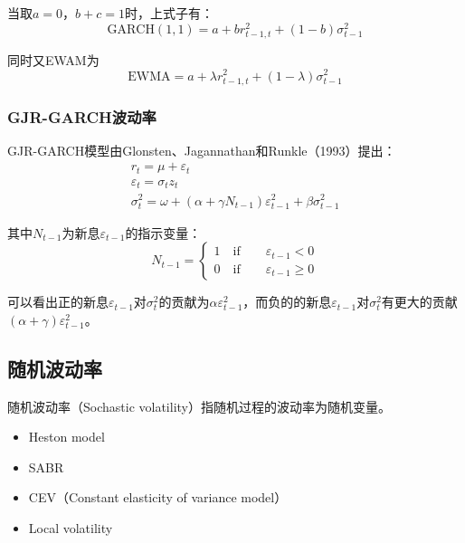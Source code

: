 \documentclass[11pt]{article}
\begin{document}
当取$a=0$，$b+c=1$时，上式子有：
\begin{equation*}
    \text{GARCH}(1,1) = a + b r^{2}_{t-1,t} + (1-b) \sigma^{2}_{t-1}
\end{equation*}

同时又EWAM为
\begin{equation*}
    \text{EWMA} = a + \lambda r^{2}_{t-1,t} + (1-\lambda) \sigma^{2}_{t-1}
\end{equation*}

\subsubsection{GJR-GARCH波动率}

GJR-GARCH模型由Glonsten、Jagannathan和Runkle（1993）提出：
\begin{gather*}
    r_t = \mu + \varepsilon_t \\
    \varepsilon_t = \sigma_t z_t \\
    \sigma^2_t = \omega + \left( \alpha + \gamma N_{t-1} \right) \varepsilon_{t-1}^2 + \beta \sigma_{t-1}^2
\end{gather*}

其中$N_{t-1}$为新息$\varepsilon_{t-1}$的指示变量：
\begin{equation*}
    N_{t-1} = 
    \begin{cases}
        1 \quad\text{if}\qquad \varepsilon_{t-1} < 0 \\
        0 \quad\text{if}\qquad \varepsilon_{t-1} \geq 0
    \end{cases}
\end{equation*}

可以看出正的新息$\varepsilon_{t-1}$对$\sigma_t^2$的贡献为$\alpha \varepsilon_{t-1}^2$，而负的的新息$\varepsilon_{t-1}$对$\sigma_t^2$有更大的贡献$\left(\alpha+\gamma\right) \varepsilon_{t-1}^2$。

\subsection{随机波动率}

随机波动率（Sochastic volatility）指随机过程的波动率为随机变量。
\begin{itemize}
    \item Heston model
    \item SABR
    \item CEV（Constant elasticity of variance model）
    \item Local volatility
\end{itemize}
\end{document}
